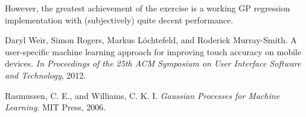 \documentclass[english,11pt]{article}
\numberwithin{equation}{section}
\begin{document}
However, the greatest achievement of the exercise is a working GP regression
implementation with (subjectively) quite decent performance.

\begin{thebibliography}{9}

        Daryl Weir, Simon Rogers, Markus L\"ochtefeld, and Roderick
        Murray-Smith. A user-specific machine learning approach for improving
        touch accuracy on mobile devices. \emph{In Proceedings of the 25th ACM
        Symposium on User Interface Software and Technology}, 2012.

        Rasmussen, C. E., and Williams, C. K. I. \emph{Gaussian Processes for
        Machine Learning}. MIT Press, 2006.

\end{thebibliography}
\end{document}
